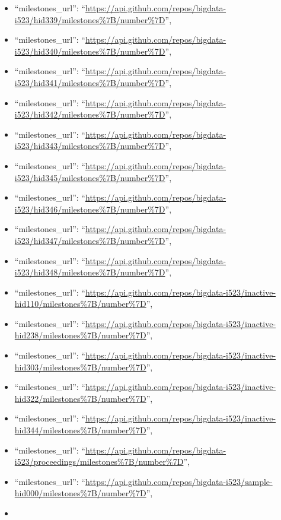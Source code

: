 \begin{itemize}
\item
  ``milestones\_url'':
  ``\url{https://api.github.com/repos/bigdata-i523/hid339/milestones\%7B/number\%7D}'',
\item
  ``milestones\_url'':
  ``\url{https://api.github.com/repos/bigdata-i523/hid340/milestones\%7B/number\%7D}'',
\item
  ``milestones\_url'':
  ``\url{https://api.github.com/repos/bigdata-i523/hid341/milestones\%7B/number\%7D}'',
\item
  ``milestones\_url'':
  ``\url{https://api.github.com/repos/bigdata-i523/hid342/milestones\%7B/number\%7D}'',
\item
  ``milestones\_url'':
  ``\url{https://api.github.com/repos/bigdata-i523/hid343/milestones\%7B/number\%7D}'',
\item
  ``milestones\_url'':
  ``\url{https://api.github.com/repos/bigdata-i523/hid345/milestones\%7B/number\%7D}'',
\item
  ``milestones\_url'':
  ``\url{https://api.github.com/repos/bigdata-i523/hid346/milestones\%7B/number\%7D}'',
\item
  ``milestones\_url'':
  ``\url{https://api.github.com/repos/bigdata-i523/hid347/milestones\%7B/number\%7D}'',
\item
  ``milestones\_url'':
  ``\url{https://api.github.com/repos/bigdata-i523/hid348/milestones\%7B/number\%7D}'',
\item
  ``milestones\_url'':
  ``\url{https://api.github.com/repos/bigdata-i523/inactive-hid110/milestones\%7B/number\%7D}'',
\item
  ``milestones\_url'':
  ``\url{https://api.github.com/repos/bigdata-i523/inactive-hid238/milestones\%7B/number\%7D}'',
\item
  ``milestones\_url'':
  ``\url{https://api.github.com/repos/bigdata-i523/inactive-hid303/milestones\%7B/number\%7D}'',
\item
  ``milestones\_url'':
  ``\url{https://api.github.com/repos/bigdata-i523/inactive-hid322/milestones\%7B/number\%7D}'',
\item
  ``milestones\_url'':
  ``\url{https://api.github.com/repos/bigdata-i523/inactive-hid344/milestones\%7B/number\%7D}'',
\item
  ``milestones\_url'':
  ``\url{https://api.github.com/repos/bigdata-i523/proceedings/milestones\%7B/number\%7D}'',
\item
  ``milestones\_url'':
  ``\url{https://api.github.com/repos/bigdata-i523/sample-hid000/milestones\%7B/number\%7D}'',
\item

\end{itemize}
